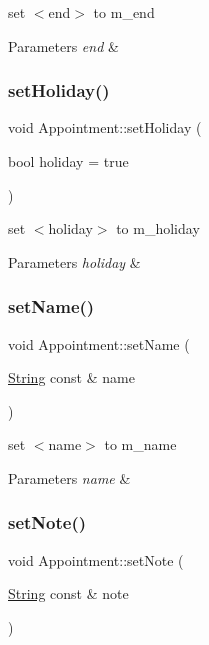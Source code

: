 set $<$end$>$ to m\+\_\+end 
\begin{DoxyParams}{Parameters}
{\em end} & \\
\hline
\end{DoxyParams}
\mbox{\label{classAppointment_acd825ab9b1d23efe1bc95dd440030094}} 
\subsubsection{\texorpdfstring{set\+Holiday()}{setHoliday()}}
{\footnotesize\ttfamily void Appointment\+::set\+Holiday (\begin{DoxyParamCaption}\item[{bool}]{holiday = {\ttfamily true} }\end{DoxyParamCaption})}

set $<$holiday$>$ to m\+\_\+holiday 
\begin{DoxyParams}{Parameters}
{\em holiday} & \\
\hline
\end{DoxyParams}
\mbox{\label{classAppointment_a65ff6f9a246d1bf437cb0be725841a84}} 
\subsubsection{\texorpdfstring{set\+Name()}{setName()}}
{\footnotesize\ttfamily void Appointment\+::set\+Name (\begin{DoxyParamCaption}\item[{\hyperlink{classString}{String} const \&}]{name }\end{DoxyParamCaption})}

set $<$name$>$ to m\+\_\+name 
\begin{DoxyParams}{Parameters}
{\em name} & \\
\hline
\end{DoxyParams}
\mbox{\label{classAppointment_a367bc61167a71691ba150808968f3b8c}} 
\subsubsection{\texorpdfstring{set\+Note()}{setNote()}}
{\footnotesize\ttfamily void Appointment\+::set\+Note (\begin{DoxyParamCaption}\item[{\hyperlink{classString}{String} const \&}]{note }\end{DoxyParamCaption})}

